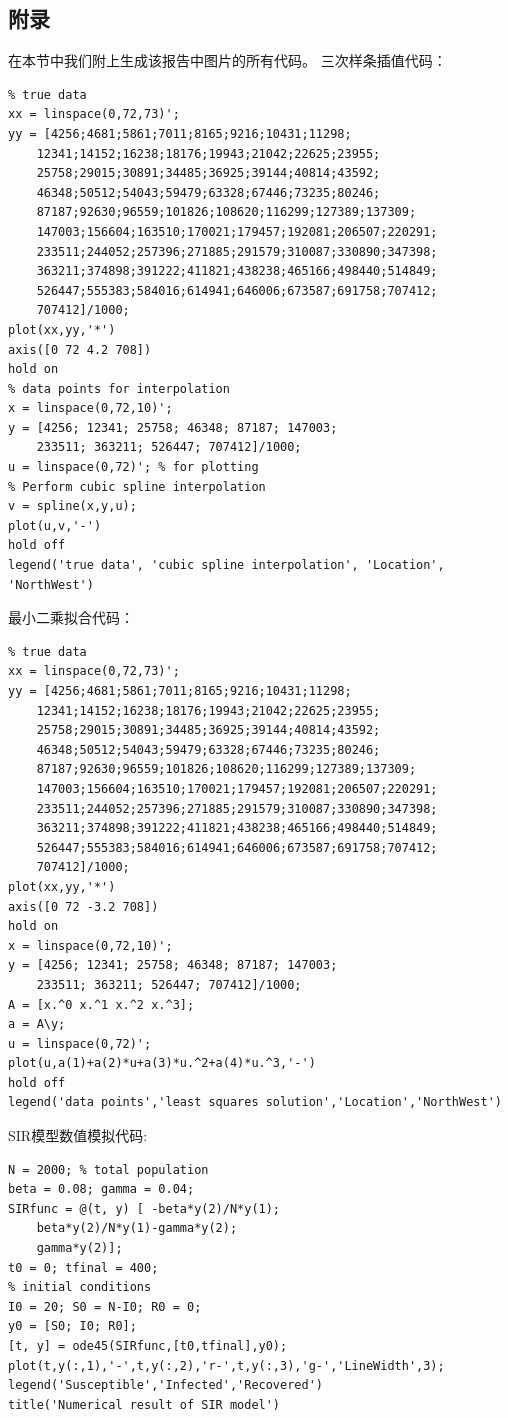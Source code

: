 \documentclass[a4paper]{article}
\begin{document}
\begin{CJK*}{UTF8}{gkai}
  \section{附录}
  在本节中我们附上生成该报告中图片的所有代码。
  三次样条插值代码：
\begin{verbatim}
% true data
xx = linspace(0,72,73)';
yy = [4256;4681;5861;7011;8165;9216;10431;11298;
    12341;14152;16238;18176;19943;21042;22625;23955;
    25758;29015;30891;34485;36925;39144;40814;43592;
    46348;50512;54043;59479;63328;67446;73235;80246;
    87187;92630;96559;101826;108620;116299;127389;137309;
    147003;156604;163510;170021;179457;192081;206507;220291;
    233511;244052;257396;271885;291579;310087;330890;347398;
    363211;374898;391222;411821;438238;465166;498440;514849;
    526447;555383;584016;614941;646006;673587;691758;707412;
    707412]/1000;
plot(xx,yy,'*')
axis([0 72 4.2 708])
hold on
% data points for interpolation
x = linspace(0,72,10)';
y = [4256; 12341; 25758; 46348; 87187; 147003;
    233511; 363211; 526447; 707412]/1000;
u = linspace(0,72)'; % for plotting
% Perform cubic spline interpolation
v = spline(x,y,u);
plot(u,v,'-')
hold off
legend('true data', 'cubic spline interpolation', 'Location', 'NorthWest')
\end{verbatim}
  最小二乘拟合代码：
\begin{verbatim}
% true data
xx = linspace(0,72,73)';
yy = [4256;4681;5861;7011;8165;9216;10431;11298;
    12341;14152;16238;18176;19943;21042;22625;23955;
    25758;29015;30891;34485;36925;39144;40814;43592;
    46348;50512;54043;59479;63328;67446;73235;80246;
    87187;92630;96559;101826;108620;116299;127389;137309;
    147003;156604;163510;170021;179457;192081;206507;220291;
    233511;244052;257396;271885;291579;310087;330890;347398;
    363211;374898;391222;411821;438238;465166;498440;514849;
    526447;555383;584016;614941;646006;673587;691758;707412;
    707412]/1000;
plot(xx,yy,'*')
axis([0 72 -3.2 708])
hold on
x = linspace(0,72,10)';
y = [4256; 12341; 25758; 46348; 87187; 147003;
    233511; 363211; 526447; 707412]/1000;
A = [x.^0 x.^1 x.^2 x.^3];
a = A\y;
u = linspace(0,72)';
plot(u,a(1)+a(2)*u+a(3)*u.^2+a(4)*u.^3,'-')
hold off
legend('data points','least squares solution','Location','NorthWest')
\end{verbatim}

  SIR模型数值模拟代码:
\begin{verbatim}
N = 2000; % total population
beta = 0.08; gamma = 0.04; 
SIRfunc = @(t, y) [ -beta*y(2)/N*y(1);
    beta*y(2)/N*y(1)-gamma*y(2);
    gamma*y(2)];
t0 = 0; tfinal = 400;
% initial conditions
I0 = 20; S0 = N-I0; R0 = 0;
y0 = [S0; I0; R0];
[t, y] = ode45(SIRfunc,[t0,tfinal],y0);
plot(t,y(:,1),'-',t,y(:,2),'r-',t,y(:,3),'g-','LineWidth',3);
legend('Susceptible','Infected','Recovered')
title('Numerical result of SIR model')
\end{verbatim}


\end{CJK*}
\end{document}
